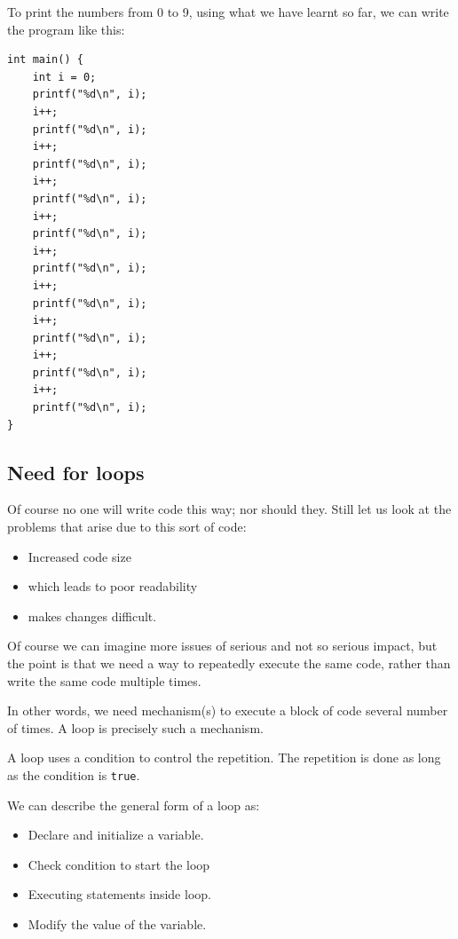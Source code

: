 \documentclass[11pt,a4paper]{article}
\author{TalentSprint}
\date{}
\begin{document}
To print the numbers from 0 to 9, using what we have learnt so far, we can write the program like this:

\begin{lstlisting}
int main() {
    int i = 0;
    printf("%d\n", i);
    i++;
    printf("%d\n", i);
    i++;
    printf("%d\n", i);
    i++;
    printf("%d\n", i);
    i++;
    printf("%d\n", i);
    i++;
    printf("%d\n", i);
    i++;
    printf("%d\n", i);
    i++;
    printf("%d\n", i);
    i++;
    printf("%d\n", i);
    i++;
    printf("%d\n", i);
}
\end{lstlisting}

\subsection*{Need for loops} Of course no one will write code this way; nor should they. Still let us look at the problems that arise due to this sort of code:
\begin{itemize}
\item Increased code size
\item which leads to poor readability
\item makes changes difficult.
\end{itemize}
Of course we can imagine more issues of serious and not so serious impact, but the point is that we need a way to repeatedly execute the same code, rather than write the same code multiple times.

In other words, we need mechanism(s) to execute  a block of code several number of times. A loop is precisely such a mechanism.

A loop uses a condition to control the repetition. The repetition is done as long as the condition is \texttt{true}.

We can describe the general form of a loop as: 
\begin{itemize}
\item Declare and initialize a variable.
\item Check condition to start the loop
\item Executing statements inside loop.
\item Modify the value of the variable.
\end{itemize}
\end{document}
